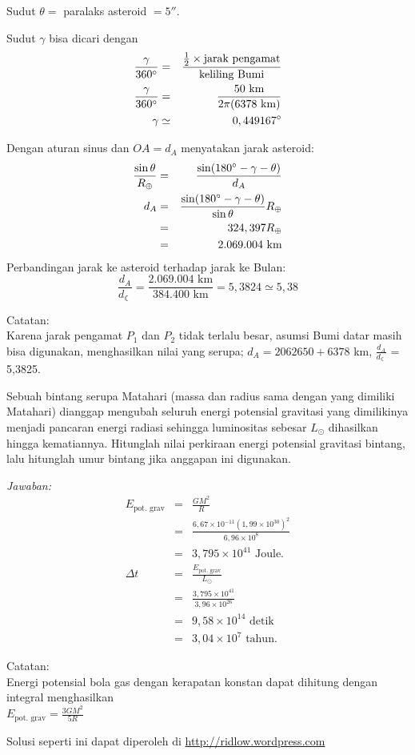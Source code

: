 \documentclass[11pt,fleqn]{exam}
\begin{document}
\begin{questions}
Sudut $\theta=$ paralaks asteroid $=5''$. 

Sudut $\gamma$ bisa dicari dengan
\begin{eqnarray*}
\frac{\gamma}{360\degree} &=& \frac{\frac{1}{2}\times\text{jarak pengamat}}{\text{keliling Bumi}}\\
\frac{\gamma}{360\degree} &=& \frac{50\text{ km}}{2\pi(6378\text{ km})}\\
\gamma &\simeq& 0,449167\degree	
\end{eqnarray*}

Dengan aturan sinus dan $OA=d_A$ menyatakan jarak asteroid:
\begin{eqnarray*}
\frac{\sin \theta}{R_{\oplus}}&=&\frac{\sin(180\degree-\gamma-\theta)}{d_A}\\
d_A&=&\frac{\sin(180\degree-\gamma-\theta)}{\sin \theta}R_{\oplus}\\
&=&324,397R_{\oplus}\\
&=&2.069.004\text{ km}\\
\end{eqnarray*}
Perbandingan jarak ke asteroid terhadap jarak ke Bulan:
\begin{equation}
\frac{d_{A}}{d_{\leftmoon}} = \frac{2.069.004\text{ km}}{384.400\text{ km}} = 5,3824 \simeq 5,38
\end{equation}

Catatan:\\
Karena jarak pengamat $P_1$ dan $P_2$ tidak terlalu besar, asumsi Bumi datar masih bisa digunakan, menghasilkan nilai yang serupa; $d_A = 2062650 + 6378$ km, $\frac{d_{A}}{d_{\leftmoon}}$ = 5,3825.


\question Sebuah bintang serupa Matahari (massa dan radius sama dengan yang dimiliki Matahari) dianggap mengubah seluruh energi potensial gravitasi yang dimilikinya menjadi pancaran energi radiasi sehingga luminositas sebesar $L_{\odot}$ dihasilkan hingga kematiannya. Hitunglah nilai perkiraan energi potensial gravitasi bintang, lalu hitunglah umur bintang jika anggapan ini digunakan.

\textit{Jawaban: }\\
\begin{eqnarray*}
E_\text{pot. grav}&=&\frac{GM^2}{R}\\
&=&\frac{6,67\times 10^{-11}(1,99\times 10^{30})^2}{6,96\times 10^8}\\
&=&3,795\times 10^{41}\text{ Joule}.\\
\Delta t&=&\frac{E_\text{pot. grav}}{L_{\odot}}\\
&=&\frac{3,795\times 10^{41}}{3,96\times 10^{26}}\\
&=&9,58\times 10^{14}\text{ detik}\\
&=&3,04\times 10^7\text{ tahun}.
\end{eqnarray*}

Catatan:\\
Energi potensial bola gas dengan kerapatan konstan dapat dihitung dengan integral menghasilkan\\
$E_\text{pot. grav} = \frac{3 G M^2}{5 R}$


\end{questions}


\vspace{1.5cm}
\begin{flushright}
Solusi seperti ini dapat diperoleh di \url{http://ridlow.wordpress.com}
\end{flushright}
\end{document}
